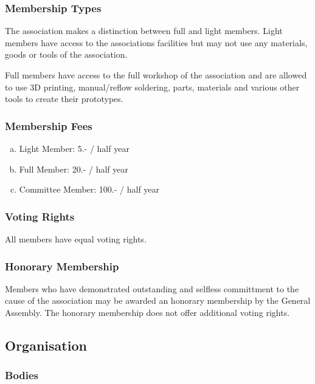 \documentclass[12pt,a4paper,oneside]{article}
\newcounter{art}
\newcommand{\english}{    \switchcolumn[0]\noindent}
\begin{document}
\begin{paracol}{2}
\english
	\subsubsection{Membership Types}
	The association makes a distinction between full and light members.
	Light members have access to the associations facilities but may not use any materials, goods or tools of the association. 

	Full members have access to the full workshop of the association and are allowed to use 3D printing, manual/reflow soldering, parts, materials and various other tools to create their prototypes.


\english
	\subsubsection{Membership Fees}

	\begin{enumerate}[(a)]
	\item Light Member: 5.- / half year 
	\item Full Member: 20.- / half year 
	\item Committee Member: 100.- / half year 
	\end{enumerate}



\english
	\subsubsection{Voting Rights}
	All members have equal voting rights.

\english
	\subsubsection{Honorary Membership}
	Members who have demonstrated outstanding and selfless committment to the cause of the association may be awarded an honorary membership by the General Assembly. The honorary membership does not offer additional voting rights.





\english
	\subsection{Organisation}

	\english
	\subsubsection{Bodies}


\end{paracol}
\end{document}
